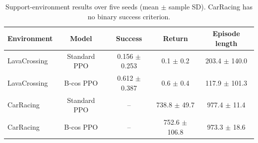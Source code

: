 \begin{table}[t]
\centering
\small
\caption{Support-environment results over five seeds (mean $\pm$ sample SD). CarRacing has no binary success criterion.}
\label{tab:rq1-support-results}
\begin{tabular}{lcccc}
\toprule
Environment & Model & Success & Return & Episode length \\
\midrule
LavaCrossing & Standard PPO & 0.156 $\pm$ 0.253 & 0.1 $\pm$ 0.2 & 203.4 $\pm$ 140.0 \\
LavaCrossing & B-cos PPO & 0.612 $\pm$ 0.387 & 0.6 $\pm$ 0.4 & 117.9 $\pm$ 101.3 \\
CarRacing & Standard PPO & -- & 738.8 $\pm$ 49.7 & 977.4 $\pm$ 11.4 \\
CarRacing & B-cos PPO & -- & 752.6 $\pm$ 106.8 & 973.3 $\pm$ 18.6 \\
\bottomrule
\end{tabular}
\end{table}
